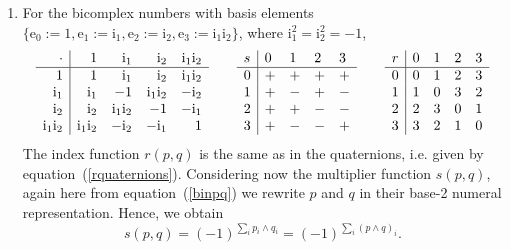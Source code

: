 \documentclass{article}
\begin{document}
\begin{enumerate}
\item For the bicomplex numbers \cite{BCQM1, BCQM2} with basis elements $\{ \mathrm e_0 := 1, \mathrm e_1 := \mathrm i_1, \mathrm e_2 := \mathrm i_2, \mathrm e_3 := \mathrm i_1\mathrm i_2 \}$, where $\mathrm i_1^2 = \mathrm i_2^2 = -1$,
$$ \begin{array}{r | r r r r}
      \cdot & 1 & \mathrm i_1 & \mathrm i_2 & \mathrm i_1 \mathrm i_2 \\
     \hline
     1 & 1 & \mathrm i_1 & \mathrm i_2 & \mathrm i_1\mathrm i_2 \\
     \mathrm i_1 & \mathrm i_1 & -1 & \mathrm i_1\mathrm i_2 & -\mathrm i_2 \\
     \mathrm i_2 & \mathrm i_2 & \mathrm i_1\mathrm i_2 & -1 & -\mathrm i_1 \\
     \mathrm i_1\mathrm i_2 & \mathrm i_1\mathrm i_2 & -\mathrm i_2 & - \mathrm i_1 & 1 \\
\end{array} \qquad \begin{array}{l | l l l l}
     s & 0 & 1 & 2 & 3 \\
     \hline
     0 & + & + & + & + \\
     1 & + & - & + & - \\
     2 & + & + & - & - \\
     3 & + & - & - & + \\
\end{array} \qquad \begin{array}{c | c c c c}
     r & 0 & 1 & 2 & 3 \\
     \hline
     0 & 0 & 1 & 2 & 3 \\
     1 & 1 & 0 & 3 & 2 \\
     2 & 2 & 3 & 0 & 1 \\
     3 & 3 & 2 & 1 & 0 \\
\end{array} $$
The index function $r(p,q)$ is the same as in the quaternions, i.e. given by equation~(\ref{rquaternions}). Considering now the multiplier function $s(p,q)$, again here from equation~(\ref{binpq}) we rewrite $p$ and $q$ in their base-2 numeral representation. Hence, we obtain
$$ 
s(p,q) = (-1)^{\sum_i p_i \wedge q_i} = (-1)^{\sum_i (p \wedge q)_i}. 
$$





\end{enumerate}
\end{document}
